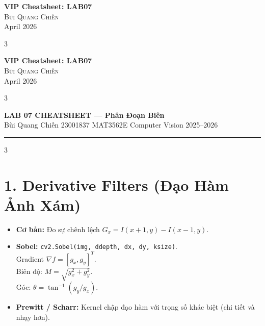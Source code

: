 \documentclass[9pt,landscape,a4paper]{extarticle}
\begin{document}
\begin{center}
    {\Large \bfseries VIP Cheatsheet: LAB07} \\
    \vspace{0.3cm}
    {\large \textsc{Bùi Quang Chiến}} \\
    \vspace{0.2cm}
    {\small April 2026}
\end{center}
\vspace{0.3cm}

\begin{multicols*}{3}

\begin{center}
    {\Large \bfseries VIP Cheatsheet: LAB07} \\
    \vspace{0.3cm}
    {\large \textsc{Bùi Quang Chiến}} \\
    \vspace{0.2cm}
    {\small April 2026}
\end{center}
\vspace{0.3cm}

\begin{multicols*}{3}

\begin{center}
  {\large\bfseries\color{hdr} LAB 07 CHEATSHEET --- Phân Đoạn Biên} \\[1pt]
  {\small Bùi Quang Chiến \textbullet{} 23001837 \textbullet{} MAT3562E Computer Vision 2025--2026}
\end{center}
\hrule\vspace{2pt}

\begin{multicols}{3}

\section{1. Derivative Filters (Đạo Hàm Ảnh Xám)}
\begin{itemize}
    \item \textbf{Cơ bản:} Đo sự chênh lệch $G_x = I(x+1, y) - I(x-1, y)$.
    \item \textbf{Sobel:} \texttt{cv2.Sobel(img, ddepth, dx, dy, ksize)}.\\
        Gradient $\nabla f = [g_x, g_y]^T$.\\
        Biên độ: $M = \sqrt{g_x^2 + g_y^2}$.\\
        Góc: $\theta = \tan^{-1}(g_y/g_x)$.
    \item \textbf{Prewitt / Scharr:} Kernel chập đạo hàm với trọng số khác biệt (chi tiết và nhạy hơn).
\end{itemize}


\end{multicols}
\end{multicols*}
\end{multicols*}
\end{document}
